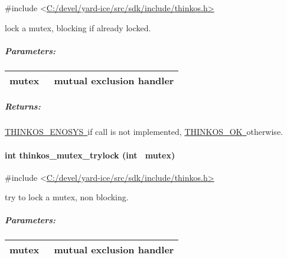 {{}

{\#include
\textless{}}{\protect\hyperlink{h.pkwqa1}{C:/devel/yard-ice/src/sdk/include/thinkos.h}}{\protect\hyperlink{h.pkwqa1}{\textgreater{}}}

{lock a mutex, blocking if already locked. }

{}

\subparagraph{\texorpdfstring{{Parameters:}}{Parameters:}}\label{parameters-10}

\protect\hypertarget{t.b0b883f74d2462ca881bd7f4d0508cf144bbde9b}{}{}\protect\hypertarget{t.10}{}{}

\begin{longtable}[]{@{}ll@{}}
\toprule
\begin{minipage}[t]{0.47\columnwidth}\raggedright\strut
{mutex}{~}\strut
\end{minipage} & \begin{minipage}[t]{0.47\columnwidth}\raggedright\strut
{mutual exclusion handler }\strut
\end{minipage}\tabularnewline
\bottomrule
\end{longtable}

\subparagraph{\texorpdfstring{{Returns:}}{Returns:}}\label{returns-13}

{\protect\hyperlink{h.3s49zyc}{THINKOS\_ENOSYS}}{\protect\hyperlink{h.3s49zyc}{~}}{if
call is not implemented,
}{\protect\hyperlink{h.2fk6b3p}{THINKOS\_OK}}{\protect\hyperlink{h.2fk6b3p}{~}}{otherwise.
}

\paragraph{\texorpdfstring{{int thinkos\_mutex\_trylock (int
~mutex)}}{int thinkos\_mutex\_trylock (int ~mutex)}}\label{int-thinkos_mutex_trylock-int-mutex}

{}

{\#include
\textless{}}{\protect\hyperlink{h.pkwqa1}{C:/devel/yard-ice/src/sdk/include/thinkos.h}}{\protect\hyperlink{h.pkwqa1}{\textgreater{}}}

{try to lock a mutex, non blocking. }

{}

\subparagraph{\texorpdfstring{{Parameters:}}{Parameters:}}\label{parameters-11}

\protect\hypertarget{t.b0b883f74d2462ca881bd7f4d0508cf144bbde9b}{}{}\protect\hypertarget{t.11}{}{}

\begin{longtable}[]{@{}ll@{}}
\toprule
\begin{minipage}[t]{0.47\columnwidth}\raggedright\strut
{mutex}{~}\strut
\end{minipage} & \begin{minipage}[t]{0.47\columnwidth}\raggedright\strut
{mutual exclusion handler }\strut
\end{minipage}\tabularnewline
\bottomrule
\end{longtable}

}
